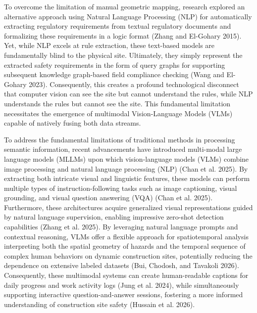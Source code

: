 \documentclass[10pt]{article}
\begin{document}
To overcome the limitation of manual geometric mapping, research explored an alternative approach using Natural Language Processing (NLP) for automatically extracting regulatory requirements from textual regulatory documents and formalizing these requirements in a logic format (Zhang and El-Gohary 2015). Yet, while NLP excels at rule extraction, these text-based models are fundamentally blind to the physical site. Ultimately, they simply represent the extracted safety requirements in the form of query graphs for supporting subsequent knowledge graph-based field compliance checking (Wang and El-Gohary 2023). Consequently, this creates a profound technological disconnect that computer vision can see the site but cannot understand the rules, while NLP understands the rules but cannot see the site. This fundamental limitation necessitates the emergence of multimodal Vision-Language Models (VLMs) capable of natively fusing both data streams.

To address the fundamental limitations of traditional methods in processing semantic information, recent advancements have introduced multi-modal large language models (MLLMs) upon which vision-language models (VLMs) combine image processing and natural language processing (NLP) (Chan et al. 2025). By extracting both intricate visual and linguistic features, these models can perform multiple types of instruction-following tasks such as image captioning, visual grounding, and visual question answering (VQA) (Chan et al. 2025). Furthermore, these architectures acquire generalized visual representations guided by natural language supervision, enabling impressive zero-shot detection capabilities (Zhang et al. 2025). By leveraging natural language prompts and contextual reasoning, VLMs offer a flexible approach for spatiotemporal analysis interpreting both the spatial geometry of hazards and the temporal sequence of complex human behaviors on dynamic construction sites, potentially reducing the dependence on extensive labeled datasets (Bui, Chodosh, and Tavakoli 2026). Consequently, these multimodal systems can create human-readable captions for daily progress and work activity logs (Jung et al. 2024), while simultaneously supporting interactive question-and-answer sessions, fostering a more informed understanding of construction site safety (Hussain et al. 2026).
\end{document}
